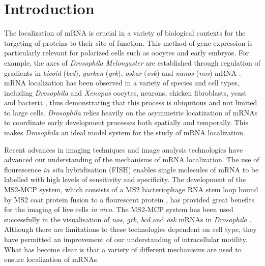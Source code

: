 \documentclass[twocolumn]{biophys}
\begin{document}
\section{Introduction}

The localization of mRNA is crucial in a variety of biological contexts for the targeting of proteins to their site of function.
This method of gene expression is particularly relevant for polarized cells such as oocytes and early embryos.
For example, the axes of \textit{Drosophila Melongaster} are established through regulation of gradients in \textit{bicoid} (\textit{bcd}), \textit{gurken} (\textit{grk}), \textit{oskar} (\textit{osk}) and \textit{nanos} (\textit{nos}) mRNA \citep{wolpert1998}.
mRNA localization has been observed in a variety of species and cell types, including \textit{Drosophila} and \textit{Xenopus} oocytes, neurons, chicken fibroblasts, yeast and bacteria \citep{wilkie2001drosophila, bobola1996asymmetric, mowry1992vegetal, rosbash1993rna, nevo2011translation}, thus demonstrating that this process is ubiquitous and not limited to large cells. 
\textit{Drosophila} relies heavily on the asymmetric locatization of mRNAs to coordinate early development processes both spatially and temporally.
This makes \textit{Drosophila} an ideal model system for the study of mRNA localization.

Recent advances in imaging techniques and image analysis technologies \citep{jeffery1983localization, bertrand1998localization, hamilton2010particlestats} have advanced our understanding of the mechanisms of mRNA localization. 
The use of flourescence \textit{in situ} hybridisation (FISH) enables single molecules of mRNA to be labelled with high levels of sensitivity and specificity. 
The development of the MS2-MCP system, which consists of a MS2 bacteriophage RNA stem loop bound by MS2 coat protein fusion to a flourescent protein \citep{parton2014subcellular}, has provided great benefits for the imaging of live cells \textit{in vivo}.
The MS2-MCP system has been used successfully in the visualisation of \textit{nos}, \textit{grk}, \textit{bcd} and \textit{osk} mRNAs in \textit{Drosophila} \citep{forrest2003live, jaramillo2008dynamics, weil2006localization, zimyanin2008vivo}.
Although there are limitations to these technologies dependent on cell type, they have permitted an improvement of our understanding of intracellular motility.
What has become clear is that a variety of different mechanisms are used to ensure localization of mRNAs.
\end{document}
